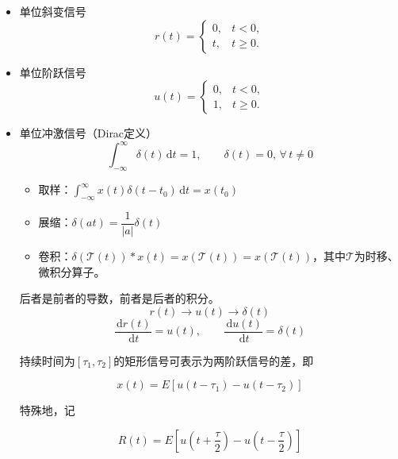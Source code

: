 \documentclass[UTF8,fontset=fandol,zihao=5]{ctexart}
\newcommand{\dd}{\,\mathrm{d}}
\begin{document}
\begin{enumerate}
    \begin{itemize}
      \item 单位斜变信号
      \[
      r(t)=
        \begin{cases}
        0, & t < 0,\\
        t, & t \geq 0.
        \end{cases}
      \]
      \item 单位阶跃信号
      \[
      u(t)=
        \begin{cases}
        0, & t < 0,\\
        1, & t \geq 0.
        \end{cases}
      \]
      \item 单位冲激信号（Dirac定义）
      \[
      \int_{-\infty}^{\infty} \delta(t) \dd t = 1, \qquad \delta(t) = 0, \, \forall \, t \neq 0
      \]

      \begin{methodbox}[【技巧】单位冲激信号性质]
        \begin{itemize}
          \item 取样：$\displaystyle \int_{-\infty}^{\infty} x(t) \delta(t-t_0) \dd t = x(t_0) $
          \item 展缩：$\delta(at) = \dfrac{1}{|a|} \delta(t)$
          \item 卷积：$\delta(\mathcal{T}(t)) \ast x(t) = x(\mathcal{T}(t)) = x(\mathcal{T}(t))$，其中$\mathcal{T}$为时移、微积分算子。
        \end{itemize}
      \end{methodbox}

      \begin{methodbox}[【技巧】三奇异信号关系]
        后者是前者的导数，前者是后者的积分。
        \[
        r(t) \to u(t) \to \delta(t)
        \]
        \[
        \dfrac{\dd r(t)}{\dd t} = u(t), \qquad \dfrac{\dd u(t)}{\dd t} = \delta(t)
        \]
      \end{methodbox}

      \begin{methodbox}[矩形信号]
        持续时间为$[\tau_1, \tau_2]$的矩形信号可表示为两阶跃信号的差，即
        
        \[
        x(t) = E \left [ u(t-\tau_1) - u(t-\tau_2) \right ]
        \]

        特殊地，记
        
        \[
        R(t) = E \left [ u\left(t+\frac{\tau}{2}\right) - u\left(t-\frac{\tau}{2}\right) \right ]
        \]
      \end{methodbox}


\end{itemize}
\end{enumerate}
\end{document}
